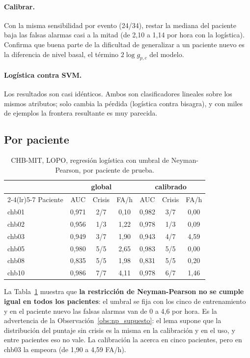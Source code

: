 \paragraph{Calibrar.} Con la misma sensibilidad por evento (24/34), restar la mediana del paciente baja las falsas alarmas
casi a la mitad (de 2,10 a 1,14 por hora con la logística). Confirma que buena parte de la dificultad de generalizar a un
paciente nuevo es la diferencia de nivel basal, el término $2\log g_{p,c}$ del modelo.

\paragraph{Logística contra SVM.} Los resultados son casi idénticos. Ambos son clasificadores lineales sobre los mismos
atributos; solo cambia la pérdida (logística contra bisagra), y con miles de ejemplos la frontera resultante es muy
parecida.

\subsection{Por paciente}

\begin{table}[ht]
\centering
\caption{CHB-MIT, LOPO, regresión logística con umbral de Neyman-Pearson, por paciente de prueba.}
\label{tab:lopo_pacientes}
\begin{tabular}{lcccccc}
\toprule
 & \multicolumn{3}{c}{global} & \multicolumn{3}{c}{calibrado} \\
\cmidrule(lr){2-4}\cmidrule(lr){5-7}
Paciente & AUC & Crisis & FA/h & AUC & Crisis & FA/h \\
\midrule
chb01 & 0,971 & 2/7 & 0,10 & 0,982 & 3/7 & 0,00 \\
chb02 & 0,956 & 1/3 & 1,22 & 0,978 & 1/3 & 0,09 \\
chb03 & 0,949 & 3/7 & 1,90 & 0,943 & 4/7 & 4,59 \\
chb05 & 0,980 & 5/5 & 2,65 & 0,983 & 5/5 & 0,00 \\
chb08 & 0,835 & 5/5 & 1,98 & 0,831 & 5/5 & 0,20 \\
chb10 & 0,986 & 7/7 & 4,11 & 0,978 & 6/7 & 1,46 \\
\bottomrule
\end{tabular}
\end{table}

La Tabla~\ref{tab:lopo_pacientes} muestra que \textbf{la restricción de Neyman-Pearson no se cumple igual en todos los
pacientes}: el umbral se fija con los cinco de entrenamiento y en el paciente nuevo las falsas alarmas van de 0 a 4,6 por
hora. Es la advertencia de la Observación~\ref{obs:np_supuesto}: el lema supone que la distribución del puntaje sin crisis
es la misma en la calibración y en el uso, y entre pacientes eso no vale. La calibración la acerca en cinco pacientes,
pero en chb03 la empeora (de 1,90 a 4,59 FA/h).

